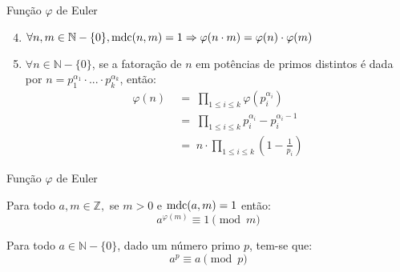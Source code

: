 \begin{frame}[fragile]{Função $\varphi$ de Euler}
    \begin{enumerate}
        \setcounter{enumi}{3}
        \item \label{item:prop-phi-4} $\forall n, m \in \mathbb{N} - \{0\}, \operatorname{mdc}(n, m) = 1 \Rightarrow \varphi(n \cdot m) = \varphi(n) \cdot \varphi(m) $
        \item \label{item:prop-phi-5} $\forall n \in \mathbb{N} - \{0\}$, se a fatoração de $n$ em potências de primos distintos é dada por $n = p_{1}^{\alpha_{1}} \cdot ... \cdot p_{k}^{\alpha_{k}}$, então:
            \begin{equation} \label{lema:phi-formula}
                \begin{split}
                    \varphi(n) \; & = \; \prod_{1 \leq i \leq k} \varphi(p_{i}^{\alpha_{i}}) \\ 
                    & = \; \prod_{1 \leq i \leq k} p_{i}^{\alpha_{i}} - p_{i}^{\alpha_{i} - 1} \\ 
                    & = \; n \cdot \prod_{1 \leq i \leq k} \left( 1 - \frac{1}{p_{i}} \right)
                \end{split}
            \end{equation}
    \end{enumerate}
\end{frame}

\begin{frame}[fragile]{Função $\varphi$ de Euler}
    \begin{teorema}
        \label{eq : euler-fermat}
        Para todo $a, m \in \mathbb{Z},$ se  $ m > 0$  e $\operatorname{mdc}(a,m) = 1$ então:
        \begin{equation*}
            a^{\varphi(m)} \equiv 1 \pmod{m}
        \end{equation*}
    \end{teorema}

    \begin{teorema}
        \label{eq : pequeno-fermat}
        Para todo $a \in \mathbb{N} - \{0\}$, dado um número primo $p$, tem-se que:
        \begin{equation*}
            a^p \equiv a \pmod{p}
        \end{equation*}
    \end{teorema}
\end{frame}